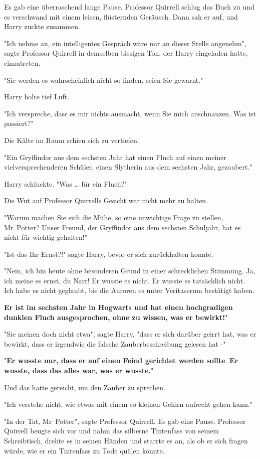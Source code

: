 {Es gab eine überraschend lange Pause. Professor Quirrell schlug das Buch zu und es verschwand mit einem leisen, flüsternden Geräusch. Dann sah er auf, und Harry zuckte zusammen.

"Ich nehme an, ein intelligentes Gespräch wäre mir an dieser Stelle angenehm", sagte Professor Quirrell in demselben bissigen Ton, der Harry eingeladen hatte, einzutreten.

"Sie werden es wahrscheinlich nicht so finden, seien Sie gewarnt."

Harry holte tief Luft.

"Ich verspreche, dass es mir nichts ausmacht, wenn Sie mich anschnauzen. Was ist passiert?"

Die Kälte im Raum schien sich zu vertiefen.

"Ein Gryffindor aus dem sechsten Jahr hat einen Fluch auf einen meiner vielversprechenderen Schüler, einen Slytherin aus dem sechsten Jahr, gezaubert."

Harry schluckte. "Was … für ein Fluch?"

Die Wut auf Professor Quirrells Gesicht war nicht mehr zu halten.

"Warum machen Sie sich die Mühe, so eine unwichtige Frage zu stellen, Mr~Potter? Unser Freund, der Gryffindor aus dem sechsten Schuljahr, hat es nicht für wichtig gehalten!"

"Ist das Ihr Ernst?!" sagte Harry, bevor er sich zurückhalten konnte.

"Nein, ich bin heute ohne besonderen Grund in einer schrecklichen Stimmung. Ja, ich meine es ernst, du Narr! Er wusste es nicht. Er wusste es tatsächlich nicht. Ich habe es nicht geglaubt, bis die Auroren es unter Veritaserum bestätigt haben.

\textbf{Er ist im sechsten Jahr in Hogwarts und hat einen hochgradigen dunklen Fluch ausgesprochen, ohne zu wissen, was er bewirkt!}"

"Sie meinen doch nicht etwa", sagte Harry, "dass er sich darüber geirrt hat, was er bewirkt, dass er irgendwie die falsche Zauberbeschreibung gelesen hat -"

"\textbf{Er wusste nur, dass er auf einen Feind gerichtet werden sollte}. \textbf{Er wusste, dass das alles war, was er wusste.}"

Und das hatte gereicht, um den Zauber zu sprechen.

"Ich verstehe nicht, wie etwas mit einem so kleinen Gehirn aufrecht gehen kann."

"In der Tat, Mr~Potter", sagte Professor Quirrell. Es gab eine Pause. Professor Quirrell beugte sich vor und nahm das silberne Tintenfass von seinem Schreibtisch, drehte es in seinen Händen und starrte es an, als ob er sich fragen würde, wie er ein Tintenfass zu Tode quälen könnte.

}
